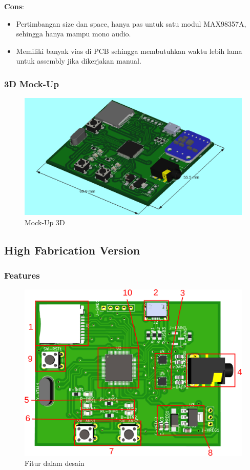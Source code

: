 \documentclass[12pt,]{article}
\begin{document}
	\textbf{Cons}:
	\begin{itemize}
		\item Pertimbangan size dan space, hanya pas untuk satu modul MAX98357A, sehingga hanya mampu mono audio.
		\item Memiliki banyak vias di PCB sehingga membutuhkan waktu lebih lama untuk assembly jika dikerjakan manual. 
	\end{itemize}
	
	\subsubsection{3D Mock-Up}
	\begin{figure}[!ht]
		\centering
		\includegraphics[width=400pt]{images/test2}
		\caption{Mock-Up 3D}
	\end{figure}


	\newpage
	\subsection{High Fabrication Version}
	
	\subsubsection{Features}
	\begin{figure}[!ht]
		\centering
		\includegraphics[width=500pt]{images/vhifab.png}
		\caption{Fitur dalam desain}
	\end{figure}
\end{document}
